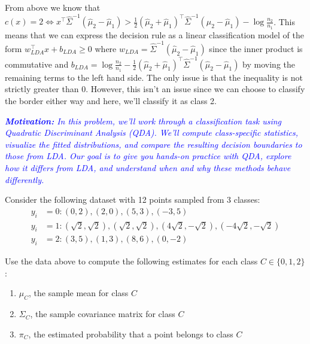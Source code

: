 \documentclass{article}
\begin{document}
\begin{probset}
\begin{prob}
\begin{subprobset}
\begin{subprob}
            \begin{soln}
                From above we know that \( c(x) = 2 \Leftrightarrow x^\top \hat{\Sigma}^{-1} (\hat{\mu}_2 - \hat{\mu}_1) > \frac{1}{2} (\hat{\mu}_2 + \hat{\mu}_1)^\top \hat{\Sigma}^{-1} (\hat{\mu}_2 - \hat{\mu}_1) - \log \frac{n_2}{n_1} \). This means that we can express the decision rule as a linear classification model of the form $w^\top_{LDA} x + b_{LDA} \geq 0$ where $w_{LDA} = \hat{\Sigma}^{-1} (\hat{\mu}_2 - \hat{\mu}_1)$ since the inner product is commutative and $b_{LDA} = \log \frac{n_2}{n_1} - \frac{1}{2} (\hat{\mu}_2 + \hat{\mu}_1)^\top \hat{\Sigma}^{-1} (\hat{\mu}_2 - \hat{\mu}_1)$ by moving the remaining terms to the left hand side. The only issue is that the inequality is not strictly greater than 0. However, this isn't an issue since we can choose to classify the border either way and here, we'll classify it as class 2.
            \end{soln}
        \end{subprob}
    \end{subprobset}
\end{prob}

\newpage
\begin{prob}
    \textit{\textcolor{blue}{\textbf{Motivation:} In this problem, we'll work through a classification task using Quadratic Discriminant Analysis (QDA). We'll compute class-specific statistics, visualize the fitted distributions, and compare the resulting decision boundaries to those from LDA. Our goal is to give you hands-on practice with QDA, explore how it
    differs from LDA, and understand when and why these methods behave differently.}}

    Consider the following dataset with 12 points sampled from 3 classes:
    \begin{align*}
        y_i &= 0 : (0, 2), (2, 0), (5, 3), (-3, 5) \\
        y_i &= 1 : (\sqrt{2}, \sqrt{2}), (\sqrt{2}, \sqrt{2}), (4\sqrt{2}, -\sqrt{2}), (-4\sqrt{2}, -\sqrt{2}) \\
        y_i &= 2 : (3, 5), (1, 3), (8, 6), (0, -2)
    \end{align*}

    \begin{subprobset}
        \begin{subprob}
            Use the data above to compute the following estimates for each class $C \in \{0, 1, 2\}$:
            \begin{enumerate}
                \item $\mu_C$, the sample mean for class $C$
                \item $\Sigma_C$, the sample covariance matrix for class $C$
                \item $\pi_C$, the estimated probability that a point belongs to class $C$
            \end{enumerate}


\end{subprob}
\end{subprobset}
\end{prob}
\end{probset}
\end{document}
